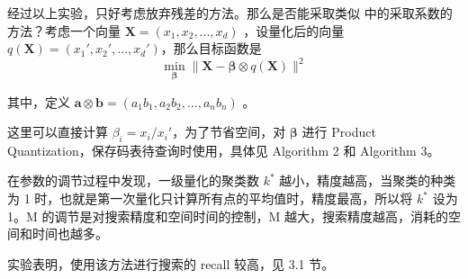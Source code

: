 \documentclass{article}
\newcommand{\tb}[1]{\textbf{#1}}
\begin{document}
经过以上实验，只好考虑放弃残差的方法。那么是否能采取类似 \cite{ref8} 中的采取系数的方法？考虑一个向量 $\tb{X} = (x_1, x_2, ..., x_d)$ ，设量化后的向量 $q(\tb{X}) = (x_1', x_2', ..., x_d')$，那么目标函数是
$$
		\mathop{\min}_{\boldsymbol{\beta}} \lVert \tb X - \boldsymbol \beta \otimes q(\tb X) \rVert ^2
$$

其中，定义 $\tb a \otimes \tb b = (a_1b_1, a_2b_2, ..., a_nb_n)$ 。

这里可以直接计算 $\beta_i = x_i / x_i'$，为了节省空间，对 $\boldsymbol{\beta}$ 进行 Product Quantization，保存码表待查询时使用，具体见 Algorithm 2 和 Algorithm 3。

在参数的调节过程中发现，一级量化的聚类数 $k^*$ 越小，精度越高，当聚类的种类为 1 时，也就是第一次量化只计算所有点的平均值时，精度最高，所以将 $k^*$ 设为 1。M 的调节是对搜索精度和空间时间的控制，M 越大，搜索精度越高，消耗的空间和时间也越多。

实验表明，使用该方法进行搜索的 recall 较高，见 3.1 节。
\end{document}
